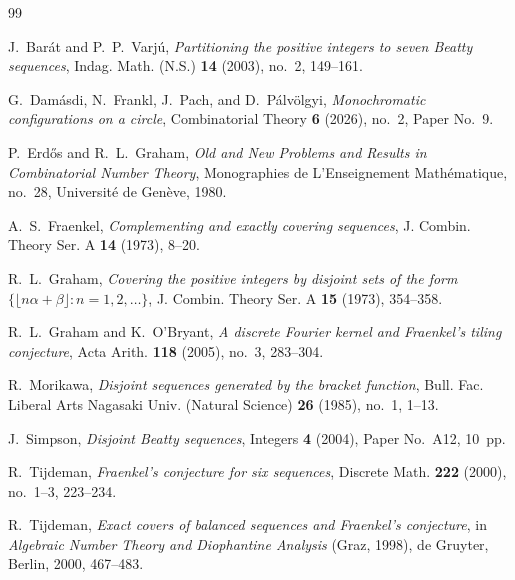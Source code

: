 \documentclass[11pt]{article}
\theoremstyle{definition}
\theoremstyle{remark}
\begin{document}
{\small
\begin{thebibliography}{99}

J.~Bar\'at and P.~P.~Varj\'u,
\emph{Partitioning the positive integers to seven Beatty sequences},
Indag. Math. (N.S.) \textbf{14} (2003), no.~2, 149--161.

G.~Dam\'asdi, N.~Frankl, J.~Pach, and D.~P\'alv\"olgyi,
\emph{Monochromatic configurations on a circle},
Combinatorial Theory \textbf{6} (2026), no.~2, Paper No.~9.


P.~Erd\H{o}s and R.~L.~Graham,
\emph{Old and New Problems and Results in Combinatorial Number Theory},
Monographies de L'Enseignement Math\'ematique, no.~28,
Universit\'e de Gen\`eve, 1980.

A.~S.~Fraenkel,
\emph{Complementing and exactly covering sequences},
J. Combin. Theory Ser. A \textbf{14} (1973), 8--20.

R.~L.~Graham,
\emph{Covering the positive integers by disjoint sets of the form
\(\{\lfloor n\alpha+\beta\rfloor:n=1,2,\ldots\}\)},
J. Combin. Theory Ser. A \textbf{15} (1973), 354--358.

R.~L.~Graham and K.~O'Bryant,
\emph{A discrete Fourier kernel and Fraenkel's tiling conjecture},
Acta Arith. \textbf{118} (2005), no.~3, 283--304.

R.~Morikawa,
\emph{Disjoint sequences generated by the bracket function},
Bull. Fac. Liberal Arts Nagasaki Univ. (Natural Science)
\textbf{26} (1985), no.~1, 1--13.

J.~Simpson,
\emph{Disjoint Beatty sequences},
Integers \textbf{4} (2004), Paper No.~A12, 10~pp.

R.~Tijdeman,
\emph{Fraenkel's conjecture for six sequences},
Discrete Math. \textbf{222} (2000), no.~1--3, 223--234.

R.~Tijdeman,
\emph{Exact covers of balanced sequences and Fraenkel's conjecture},
in \emph{Algebraic Number Theory and Diophantine Analysis} (Graz, 1998),
de Gruyter, Berlin, 2000, 467--483.

\end{thebibliography}
}
\end{document}
